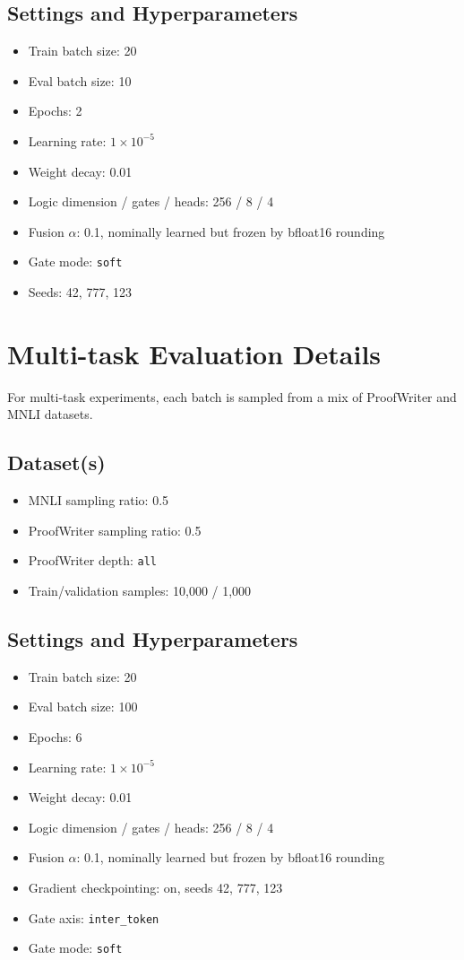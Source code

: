 \documentclass[10pt,twocolumn,letterpaper]{article}
\begin{document}
\subsection{Settings and Hyperparameters}
\begin{itemize}
\item Train batch size: 20
\item Eval batch size: 10
\item Epochs: 2
\item Learning rate: $1\times10^{-5}$
\item Weight decay: 0.01
\item Logic dimension / gates / heads: 256 / 8 / 4
\item Fusion $\alpha$: 0.1, nominally learned but frozen by bfloat16 rounding
\item Gate mode: \texttt{soft}
\item Seeds: 42, 777, 123
\end{itemize}


\section{Multi-task Evaluation Details}
For multi-task experiments, each batch is sampled from a mix
of ProofWriter and MNLI datasets.

\subsection{Dataset(s)}
\begin{itemize}
\item MNLI sampling ratio: 0.5
\item ProofWriter sampling ratio: 0.5
\item ProofWriter depth: \texttt{all}
\item Train/validation samples: 10,000 / 1,000
\end{itemize}

\subsection{Settings and Hyperparameters}
\begin{itemize}
\item Train batch size: 20
\item Eval batch size: 100
\item Epochs: 6
\item Learning rate: $1\times10^{-5}$
\item Weight decay: 0.01
\item Logic dimension / gates / heads: 256 / 8 / 4
\item Fusion $\alpha$: 0.1, nominally learned but frozen by bfloat16 rounding
\item Gradient checkpointing: on, seeds 42, 777, 123
\item Gate axis: \texttt{inter\_token}
\item Gate mode: \texttt{soft}
\end{itemize}
\end{document}
